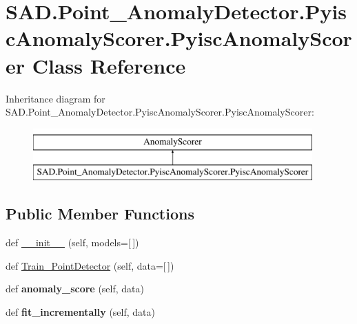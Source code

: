 \hypertarget{classSAD_1_1Point__AnomalyDetector_1_1PyiscAnomalyScorer_1_1PyiscAnomalyScorer}{}\section{S\+A\+D.\+Point\+\_\+\+Anomaly\+Detector.\+Pyisc\+Anomaly\+Scorer.\+Pyisc\+Anomaly\+Scorer Class Reference}
\label{classSAD_1_1Point__AnomalyDetector_1_1PyiscAnomalyScorer_1_1PyiscAnomalyScorer}
Inheritance diagram for S\+A\+D.\+Point\+\_\+\+Anomaly\+Detector.\+Pyisc\+Anomaly\+Scorer.\+Pyisc\+Anomaly\+Scorer\+:\begin{figure}[H]
\begin{center}
\leavevmode
\includegraphics[height=2.000000cm]{classSAD_1_1Point__AnomalyDetector_1_1PyiscAnomalyScorer_1_1PyiscAnomalyScorer}
\end{center}
\end{figure}
\subsection*{Public Member Functions}
\begin{DoxyCompactItemize}
\item 
def \hyperlink{classSAD_1_1Point__AnomalyDetector_1_1PyiscAnomalyScorer_1_1PyiscAnomalyScorer_abc3bc5cec9cb7a036e27d38fd754a971}{\+\_\+\+\_\+init\+\_\+\+\_\+} (self, models=\mbox{[}$\,$\mbox{]})
\item 
def \hyperlink{classSAD_1_1Point__AnomalyDetector_1_1PyiscAnomalyScorer_1_1PyiscAnomalyScorer_ae27cbcb8c835a0fa016b9eafa4045052}{Train\+\_\+\+Point\+Detector} (self, data=\mbox{[}$\,$\mbox{]})
\item 
def {\bfseries anomaly\+\_\+score} (self, data)\hypertarget{classSAD_1_1Point__AnomalyDetector_1_1PyiscAnomalyScorer_1_1PyiscAnomalyScorer_a351d3ad46171d21bbb74172fcb0de863}{}\label{classSAD_1_1Point__AnomalyDetector_1_1PyiscAnomalyScorer_1_1PyiscAnomalyScorer_a351d3ad46171d21bbb74172fcb0de863}

\item 
def {\bfseries fit\+\_\+incrementally} (self, data)\hypertarget{classSAD_1_1Point__AnomalyDetector_1_1PyiscAnomalyScorer_1_1PyiscAnomalyScorer_af97fea4a0d078209a68cb25516f9226a}{}\label{classSAD_1_1Point__AnomalyDetector_1_1PyiscAnomalyScorer_1_1PyiscAnomalyScorer_af97fea4a0d078209a68cb25516f9226a}

\end{DoxyCompactItemize}

